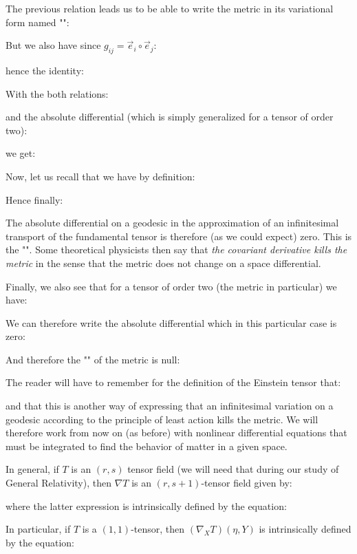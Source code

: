 	The previous relation leads us to be able to write the metric in its variational form named "":
	
	But we also have since $g_{ij}=\vec{e}_i\circ\vec{e}_j$:
	
	hence the identity:
	
	With the both relations:
	
	and the absolute differential (which is simply generalized for a tensor of order two):
	
	we get:
	
	Now, let us recall that we have by definition:
	
	Hence finally:
	
	The absolute differential on a geodesic in the approximation of an infinitesimal transport of the fundamental tensor is therefore (as we could expect) zero. This is the "". Some theoretical physicists then say that \og \textit{the covariant derivative kills the metric} \fg{} in the sense that the metric does not change on a space differential.

	Finally, we also see that for a tensor of order two (the metric in particular) we have:
	
	We can therefore write the absolute differential which in this particular case is zero:
	
	And therefore the "" of the metric is null:
	
	\begin{tcolorbox}[title=Remark,colframe=black,arc=10pt]
	The reader will have to remember for the definition of the Einstein tensor that:
	
	and that this is another way of expressing that an infinitesimal variation on a geodesic according to the principle of least action kills the metric. We will therefore work from now on (as before) with nonlinear differential equations that must be integrated to find the behavior of matter in a given space.
	\end{tcolorbox}
	In general, if $T$ is an $(r,s)$ tensor field (we will need that during our study of General Relativity), then $\nabla T$ is an $(r,s+1)$-tensor field given by:
	
	where the latter expression is intrinsically defined by the equation:
	
	In particular, if $T$ is a $(1,1)$-tensor, then $(\nabla_X T)(\eta,Y)$ is intrinsically defined by the equation:
	
